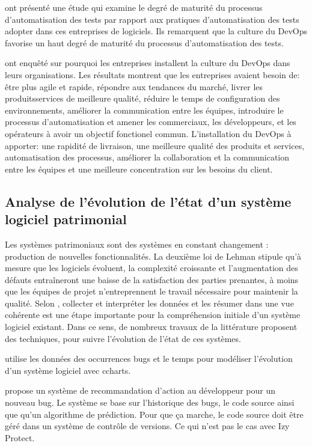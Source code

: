 \documentclass[a4paper]{article}
\begin{document}
\citet{Yuqi20a} ont présenté une étude qui examine le degré de maturité du processus d'automatisation des tests par rapport aux pratiques d'automatisation des tests adopter dans ces entreprises de logiciels.
Ils remarquent que la culture du DevOps favorise un haut degré de  maturité du processus d'automatisation des tests.

\citet{Jess20a} ont enquêté sur  pourquoi les entreprises installent la culture du DevOps  dans leurs organisations. 
Les résultats montrent que les entreprises avaient besoin de: être plus agile et rapide, répondre aux tendances du marché, livrer les produits\/services de meilleure qualité,
réduire le temps de configuration des environnements,  améliorer la communication entre les équipes, introduire le processus d'automatisation et amener les commerciaux, les développeurs, et les opérateurs à avoir un objectif fonctionel commun. 
L'installation du DevOps à apporter: une rapidité de livraison, une meilleure qualité des produits et services, automatisation des processus,
améliorer la collaboration et la communication entre les équipes et une meilleure concentration sur les besoins du client.



\subsection{Analyse de l'évolution de l'état d'un système logiciel patrimonial}
\label{sec:etatLogiciel}
Les systèmes patrimoniaux sont des systèmes en constant changement : production de nouvelles fonctionnalités.
La deuxième loi de Lehman \cite{Lehm96a} stipule qu'à mesure que les logiciels évoluent, la complexité croissante et l'augmentation des défauts entraîneront une baisse de la satisfaction des parties prenantes, à moins que les équipes de projet n'entreprennent le travail nécessaire pour maintenir la qualité.
Selon \citet{Deme02a}, collecter et interpréter les données et les résumer dans une vue cohérente est une étape importante pour la compréhension initiale d'un système logiciel existant.
Dans ce sens, de nombreux travaux de la littérature proposent des techniques, pour suivre l'évolution de l'état de ces systèmes.

\citet{Zhan10b} utilise les données des occurrences bugs et le temps pour modéliser l'évolution d'un système logiciel avec c\-charts.

\citet{lenar17} propose un système de recommandation d'action au développeur pour un nouveau bug.
Le système se base sur l'historique des bugs, le code source ainsi que qu'un algorithme de prédiction.
Pour que ça marche, le code source doit être géré dans un système de contrôle de versions. 
Ce qui n'est pas le cas avec Izy Protect.
\end{document}
